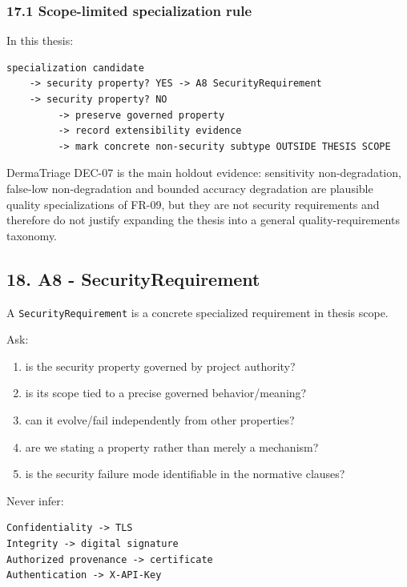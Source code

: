 \documentclass[11pt,a4paper]{article}
\providecommand{\tightlist}{\setlength{\itemsep}{0pt}\setlength{\parskip}{0pt}}
\begin{document}
\subsubsection{17.1 Scope-limited specialization
rule}\label{171-scope-limited-specialization-rule}

In this thesis:

\begin{verbatim}
specialization candidate
    -> security property? YES -> A8 SecurityRequirement
    -> security property? NO
         -> preserve governed property
         -> record extensibility evidence
         -> mark concrete non-security subtype OUTSIDE THESIS SCOPE
\end{verbatim}

DermaTriage DEC-07 is the main holdout evidence: sensitivity
non-degradation, false-low non-degradation and bounded accuracy
degradation are plausible quality specializations of FR-09, but they are
not security requirements and therefore do not justify expanding the
thesis into a general quality-requirements taxonomy.

\subsection{18. A8 -
SecurityRequirement}\label{18-a8---securityrequirement}

A \texttt{SecurityRequirement} is a concrete specialized requirement in
thesis scope.

Ask:

\begin{enumerate}
\def\labelenumi{\arabic{enumi}.}
\tightlist
\item
  is the security property governed by project authority?
\item
  is its scope tied to a precise governed behavior/meaning?
\item
  can it evolve/fail independently from other properties?
\item
  are we stating a property rather than merely a mechanism?
\item
  is the security failure mode identifiable in the normative clauses?
\end{enumerate}

Never infer:

\begin{verbatim}
Confidentiality -> TLS
Integrity -> digital signature
Authorized provenance -> certificate
Authentication -> X-API-Key
\end{verbatim}
\end{document}
